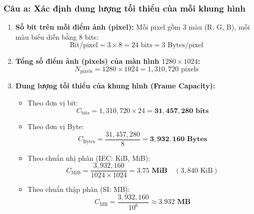 \documentclass[a4paper]{article}
\numberwithin{figure}{section}
\numberwithin{table}{section}
\begin{document}
\subsubsection*{Câu a: Xác định dung lượng tối thiểu của mỗi khung hình}
\begin{enumerate}
    \item \textbf{Số bit trên mỗi điểm ảnh (pixel):}
    Mỗi pixel gồm 3 màu (R, G, B), mỗi màu biểu diễn bằng 8 bits:
    \begin{equation*}
        \text{Bit/pixel} = 3 \times 8 = 24\text{ bits} = 3\text{ Bytes/pixel}
    \end{equation*}
    \item \textbf{Tổng số điểm ảnh (pixels) của màn hình $1280 \times 1024$:}
    \begin{equation*}
        N_{\text{pixels}} = 1280 \times 1024 = 1{,}310{,}720\text{ pixels}
    \end{equation*}
    \item \textbf{Dung lượng tối thiểu của khung hình (Frame Capacity):}
    \begin{itemize}
        \item Theo đơn vị bit:
        \begin{equation*}
            C_{\text{bits}} = 1{,}310{,}720 \times 24 = \mathbf{31{,}457{,}280\text{ bits}}
        \end{equation*}
        \item Theo đơn vị Byte:
        \begin{equation*}
            C_{\text{Bytes}} = \frac{31{,}457{,}280}{8} = \mathbf{3{,}932{,}160\text{ Bytes}}
        \end{equation*}
        \item Theo chuẩn nhị phân (IEC: KiB, MiB):
        \begin{equation*}
            C_{\text{MiB}} = \frac{3{,}932{,}160}{1024 \times 1024} = \mathbf{3.75\text{ MiB}} \quad (3{,}840\text{ KiB})
        \end{equation*}
        \item Theo chuẩn thập phân (SI: MB):
        \begin{equation*}
            C_{\text{MB}} = \frac{3{,}932{,}160}{10^6} \approx \mathbf{3.932\text{ MB}}
        \end{equation*}
    \end{itemize}
\end{enumerate}
\end{document}
